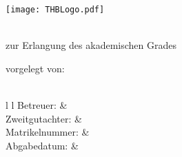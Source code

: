 \begin{titlepage}
\begin{center}

\texttt{[image: THBLogo.pdf]}

\vspace{2cm}
{\LARGE \textsf{\textbf{\myTitel}} \par}
\vspace{0.5cm}
{\Large \textsf{\textbf{\myUntertitel}} \par}

\vspace{2cm}
{\Large \textsf{\textbf{\myThesisArt}} } \\

\vspace{1cm}
zur Erlangung des akademischen Grades\\
\vspace{0.5cm}
{\large \myAkademischerGrad}

\vspace{1.5cm}

vorgelegt von:\\
\vspace{0.5cm}
{\Large \myAutor} \\

\vfill
\begin{tblr}{ l l }
	Betreuer: & \myBetreuer \\
	Zweitgutachter: & \myZweitgutachter \\
	Matrikelnummer: & \myMatrikelNr \\
	Abgabedatum: & \myAbgabeDatum \\
\end{tblr}
\end{center}
\end{titlepage}
\restoregeometry %